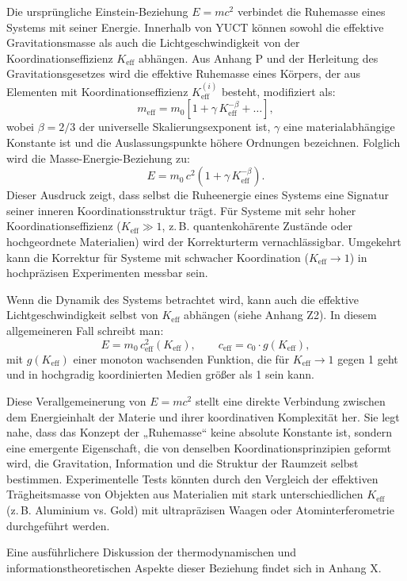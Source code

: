 \documentclass[12pt]{article}
\theoremstyle{remark}
\begin{document}
	Die ursprüngliche Einstein-Beziehung $E = m c^{2}$ verbindet die Ruhemasse eines Systems mit seiner Energie. Innerhalb von YUCT können sowohl die effektive Gravitationsmasse als auch die Lichtgeschwindigkeit von der Koordinationseffizienz $K_{\mathrm{eff}}$ abhängen. Aus Anhang P und der Herleitung des Gravitationsgesetzes wird die effektive Ruhemasse eines Körpers, der aus Elementen mit Koordinationseffizienz $K_{\mathrm{eff}}^{(i)}$ besteht, modifiziert als:
	\[
	m_{\mathrm{eff}} = m_{0} \left[ 1 + \gamma \, K_{\mathrm{eff}}^{-\beta} + \dots \right],
	\]
	wobei $\beta = 2/3$ der universelle Skalierungsexponent ist, $\gamma$ eine materialabhängige Konstante ist und die Auslassungspunkte höhere Ordnungen bezeichnen. Folglich wird die Masse-Energie-Beziehung zu:
	\[
	\boxed{E = m_{0} \, c^{2} \left( 1 + \gamma \, K_{\mathrm{eff}}^{-\beta} \right)}.
	\]
	Dieser Ausdruck zeigt, dass selbst die Ruheenergie eines Systems eine Signatur seiner inneren Koordinationsstruktur trägt. Für Systeme mit sehr hoher Koordinationseffizienz ($K_{\mathrm{eff}} \gg 1$, z. B. quantenkohärente Zustände oder hochgeordnete Materialien) wird der Korrekturterm vernachlässigbar. Umgekehrt kann die Korrektur für Systeme mit schwacher Koordination ($K_{\mathrm{eff}} \to 1$) in hochpräzisen Experimenten messbar sein.
	
	Wenn die Dynamik des Systems betrachtet wird, kann auch die effektive Lichtgeschwindigkeit selbst von $K_{\mathrm{eff}}$ abhängen (siehe Anhang Z2). In diesem allgemeineren Fall schreibt man:
	\[
	E = m_{0} \, c_{\mathrm{eff}}^{2}(K_{\mathrm{eff}}),\qquad
	c_{\mathrm{eff}} = c_{0} \cdot g(K_{\mathrm{eff}}),
	\]
	mit $g(K_{\mathrm{eff}})$ einer monoton wachsenden Funktion, die für $K_{\mathrm{eff}} \to 1$ gegen 1 geht und in hochgradig koordinierten Medien größer als 1 sein kann.
	
	Diese Verallgemeinerung von $E = mc^{2}$ stellt eine direkte Verbindung zwischen dem Energieinhalt der Materie und ihrer koordinativen Komplexität her. Sie legt nahe, dass das Konzept der „Ruhemasse“ keine absolute Konstante ist, sondern eine emergente Eigenschaft, die von denselben Koordinationsprinzipien geformt wird, die Gravitation, Information und die Struktur der Raumzeit selbst bestimmen. Experimentelle Tests könnten durch den Vergleich der effektiven Trägheitsmasse von Objekten aus Materialien mit stark unterschiedlichen $K_{\mathrm{eff}}$ (z. B. Aluminium vs. Gold) mit ultrapräzisen Waagen oder Atominterferometrie durchgeführt werden.
	
	Eine ausführlichere Diskussion der thermodynamischen und informationstheoretischen Aspekte dieser Beziehung findet sich in Anhang X.
	
\end{document}
